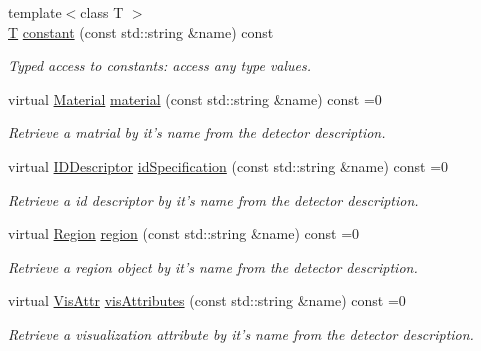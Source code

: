 \begin{DoxyCompactItemize}
{\footnotesize template$<$class T $>$ }\\\hyperlink{class_t}{T} \hyperlink{class_d_d4hep_1_1_geometry_1_1_l_c_d_d_ae0b36775a484f3b7e6f7b3d5910062a2}{constant} (const std::string \&name) const 
\begin{DoxyCompactList}\small\item\em Typed access to constants: access any type values. \item\end{DoxyCompactList}\item 
virtual \hyperlink{class_d_d4hep_1_1_geometry_1_1_material}{Material} \hyperlink{class_d_d4hep_1_1_geometry_1_1_l_c_d_d_aec8adc99bc62ade78afd0a444a76fd04}{material} (const std::string \&name) const =0
\begin{DoxyCompactList}\small\item\em Retrieve a matrial by it's name from the detector description. \item\end{DoxyCompactList}\item 
virtual \hyperlink{class_d_d4hep_1_1_geometry_1_1_i_d_descriptor}{IDDescriptor} \hyperlink{class_d_d4hep_1_1_geometry_1_1_l_c_d_d_ac08b5db047061a7b08d8b78bd7cb5e72}{idSpecification} (const std::string \&name) const =0
\begin{DoxyCompactList}\small\item\em Retrieve a id descriptor by it's name from the detector description. \item\end{DoxyCompactList}\item 
virtual \hyperlink{class_d_d4hep_1_1_geometry_1_1_region}{Region} \hyperlink{class_d_d4hep_1_1_geometry_1_1_l_c_d_d_adbe06759881707fe995472c03810c0ff}{region} (const std::string \&name) const =0
\begin{DoxyCompactList}\small\item\em Retrieve a region object by it's name from the detector description. \item\end{DoxyCompactList}\item 
virtual \hyperlink{class_d_d4hep_1_1_geometry_1_1_vis_attr}{VisAttr} \hyperlink{class_d_d4hep_1_1_geometry_1_1_l_c_d_d_a449330acbb5a5d6ba6f1fa2d97cea338}{visAttributes} (const std::string \&name) const =0
\begin{DoxyCompactList}\small\item\em Retrieve a visualization attribute by it's name from the detector description. \item\end{DoxyCompactList}\item 

\end{DoxyCompactItemize}
